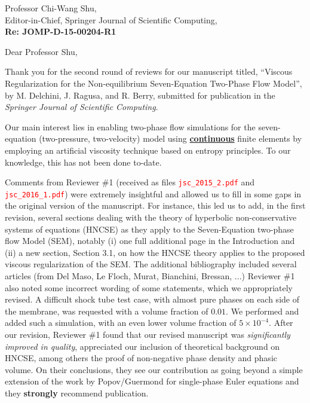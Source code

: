 \documentclass[11pt]{letter}
\newcommand{\tcr}[1]{\textcolor{red}{#1}}
\begin{document}
\begin{letter}{Professor Chi-Wang Shu, \\  Editor-in-Chief, Springer Journal of Scientific Computing,\\
\textbf{Re: JOMP-D-15-00204-R1}}


\date{\today}

\opening{Dear Professor Shu,}
         \vspace{0.25cm}

Thank you for the second round of reviews for our manuscript titled, 
``Viscous Regularization for the Non-equilibrium Seven-Equation Two-Phase Flow Model'',  
by M. Delchini, J. Ragusa, and R. Berry, submitted for publication in the {\it  Springer Journal of Scientific Computing}. 

Our main interest lies
in enabling two-phase flow simulations for the seven-equation (two-pressure, two-velocity) model using \underline{{\bf continuous}}
finite elements by employing an artificial viscosity technique based on entropy principles. To our knowledge, this has 
not been done to-date.

Comments from Reviewer \#1 (received as files \tcr{{\tt jsc\_2015\_2.pdf}} and \tcr{{\tt jsc\_2016\_1.pdf}}) 
were extremely insightful and allowed
us to fill in some gaps in the original version of the manuscript. 
For instance, this led us to add, in the first revision, several sections
dealing with the theory of hyperbolic non-conservative systems of equations (HNCSE) as they apply to the 
Seven-Equation two-phase flow Model (SEM), notably (i) one full additional page in the Introduction and 
(ii) a new section, Section 3.1, on how the HNCSE theory applies to the proposed viscous regularization of the SEM.
The additional bibliography included several articles (from Del Maso, Le Floch, Murat, Bianchini, Bressan, ...) 
Reviewer \#1 also noted some incorrect wording of some statements, which we appropriately revised. A difficult shock 
tube test case, with almost pure phases on each side of the membrane, was requested with a volume fraction of $0.01$. We
performed and added such a simulation, with an even lower volume fraction of $5\times 10^{-4}$. 
After our revision, Reviewer \#1 found that our revised manuscript was {\it significantly improved in quality}, appreciated our inclusion of
theoretical background on HNCSE, among others the proof of non-negative phase density and phasic volume.  On their
conclusions, they see our contribution as going beyond a simple extension of the work by Popov/Guermond for single-phase Euler equations and they {\bf strongly} recommend publication.


\end{letter}
\end{document}
